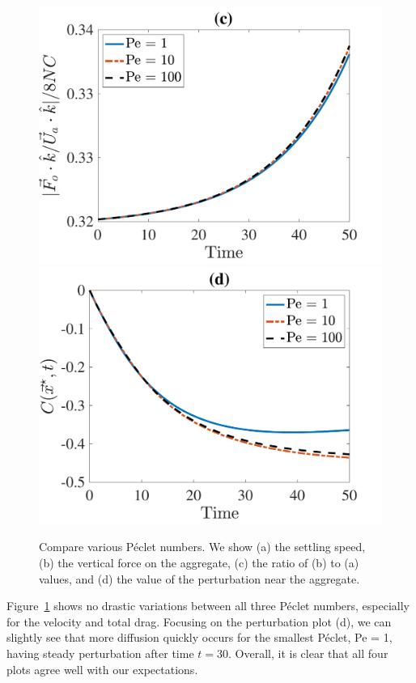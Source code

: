 \begin{figure}[ht]
\begin{center}
		\includegraphics[scale=0.35]{./figures/fig_NC50_Pe_Fo3Ua_ratio}
		\includegraphics[scale=0.35]{./figures/fig_NC50_Pe_C_star}
	\caption{Compare various Péclet numbers. We show (a) the settling speed, (b) the vertical force on the aggregate, (c) the ratio of (b) to (a) values, and (d) the value of the perturbation near the aggregate.}
	\label{fig_NC50_Pe}
\end{center}
\end{figure}
\par
Figure~\ref{fig_NC50_Pe} shows no drastic variations between all three Péclet numbers, especially for the velocity and total drag. 
Focusing on the perturbation plot (d), we can slightly see that more diffusion quickly occurs for the smallest Péclet, Pe = 1, having steady perturbation after time $t = 30$.
Overall, it is clear that all four plots agree well with our expectations. 
